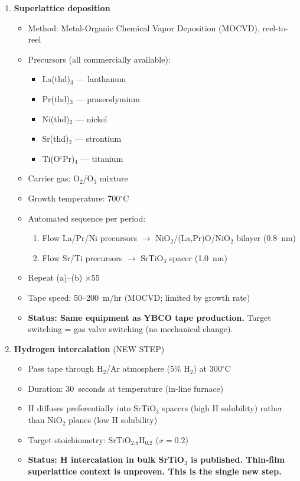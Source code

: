 \documentclass[11pt, a4paper]{article}
\begin{document}
\begin{enumerate}
  \item \textbf{Superlattice deposition}
    \begin{itemize}[nosep]
      \item Method: Metal-Organic Chemical Vapor Deposition (MOCVD),
            reel-to-reel
      \item Precursors (all commercially available):
        \begin{itemize}[nosep]
          \item La(thd)$_3$ --- lanthanum
          \item Pr(thd)$_3$ --- praseodymium
          \item Ni(thd)$_2$ --- nickel
          \item Sr(thd)$_2$ --- strontium
          \item Ti(O$^i$Pr)$_4$ --- titanium
        \end{itemize}
      \item Carrier gas: O$_2$/O$_3$ mixture
      \item Growth temperature: 700$^\circ$C
      \item Automated sequence per period:
        \begin{enumerate}[nosep, label=(\alph*)]
          \item Flow La/Pr/Ni precursors $\to$
                NiO$_2$/(La,Pr)O/NiO$_2$ bilayer (0.8~nm)
          \item Flow Sr/Ti precursors $\to$
                SrTiO$_3$ spacer (1.0~nm)
        \end{enumerate}
      \item Repeat (a)--(b) $\times 55$
      \item Tape speed: 50--200~m/hr (MOCVD; limited by growth rate)
      \item \textcolor{nm-green}{\textbf{Status: Same equipment as
            YBCO tape production.}} Target switching = gas valve
            switching (no mechanical change).
    \end{itemize}

  \item \textbf{Hydrogen intercalation} \textcolor{nm-red}{(NEW STEP)}
    \begin{itemize}[nosep]
      \item Pass tape through H$_2$/Ar atmosphere (5\% H$_2$) at
            300$^\circ$C
      \item Duration: 30~seconds at temperature (in-line furnace)
      \item H diffuses preferentially into SrTiO$_3$ spacers
            (high H solubility) rather than NiO$_2$ planes
            (low H solubility)
      \item Target stoichiometry: SrTiO$_{2.8}$H$_{0.2}$ ($x = 0.2$)
      \item \textcolor{nm-red}{\textbf{Status: H intercalation in
            bulk SrTiO$_3$ is published. Thin-film superlattice
            context is unproven. This is the single new step.}}
    \end{itemize}


\end{enumerate}
\end{document}
